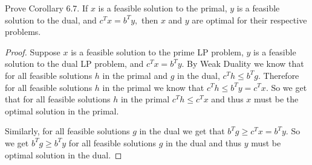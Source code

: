 \documentclass[12pt]{article}
\makeatletter
\theoremstyle{homework}
\newenvironment{exercise}[1]
{\def\@currentlabel{#1}\exercisecore}
{\endexercisecore}
\makeatother
\begin{document}
\begin{exercise}{2.4} Prove Corollary 6.7. If $x$ is a feasible solution to the primal, $y$ is a feasible solution to the dual, and 
  $c^Tx = b^Ty,$ then $x$ and $y$ are optimal for their respective problems. 
  \begin{proof} Suppose $x$ is a feasible solution to the prime LP problem, $y$ is a feasible solution to the dual LP problem, and 
    $c^Tx = b^Ty$. By Weak Duality we know that for all feasible solutions $h$ in the primal and $g$ in the dual, $c^Th \leq b^Tg$.
    Therefore for all feasible solutions $h$ in the primal we know that $c^Th \leq b^Ty = c^Tx$. So we get that for all feasible solutions
    $h$ in the primal $c^Th \leq c^Tx$ and thus $x$ must be the optimal solution in the primal.


    Similarly, for all feasible solutions $g$ in the dual we get that $b^Tg \geq c^Tx = b^Ty$. So we get $b^Tg \geq b^Ty$ for all feasible solutions 
    $g$ in the dual and thus $y$ must be optimal solution in the dual. 
 \end{proof}
\end{exercise}
\vspace{.5in}
\end{document}
